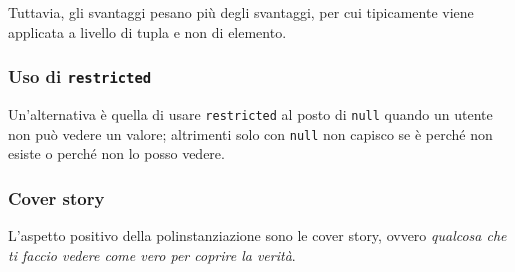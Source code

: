 \documentclass{report}
\begin{document}
\noindent Tuttavia, gli svantaggi pesano più degli svantaggi, per cui tipicamente viene applicata a 
livello di tupla e non di elemento.

\subsubsection{Uso di \texttt{restricted}}

\noindent Un'alternativa è quella di usare \texttt{restricted} al posto di \texttt{null} quando 
un utente non può vedere un valore; altrimenti solo con \texttt{null} non capisco se è perché non esiste 
o perché non lo posso vedere.

\subsubsection{Cover story}
L'aspetto positivo della polinstanziazione sono le cover story, ovvero \textit{qualcosa che ti faccio 
vedere come vero per coprire la verità}.
\end{document}
